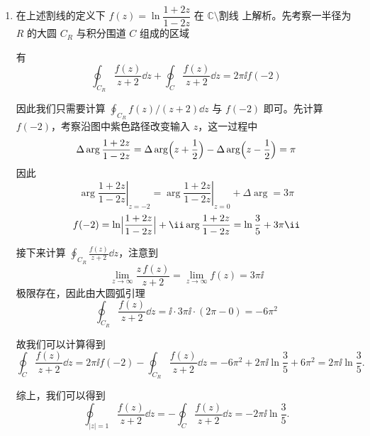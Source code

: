 \begin{question}
\begin{solution}
\begin{enumerate}
综上有
\[ f(z)=\begin{cases}
32\pi\ii\cdot\dfrac{-z-1}{z^2}, & |z|>2,\\[6pt]
32\pi\ii\cdot\dfrac{\ee^{z}-z-1}{z^2}, & |z|<2
\end{cases} \]

  \item 在上述割线的定义下 \(f(z)=\ln\dfrac{1+2z}{1-2z}\) 在 \(\mathbb{C}\setminus\text{割线}\) 上解析。先考察一半径为 \(R\) 的大圆 \(C_R\) 与积分围道 \(C\) 组成的区域

\begin{center}
\end{center}

有
\[ \oint_{C_R} \frac{f(z)}{z+2}\dd{z} + \oint_{C} \frac{f(z)}{z+2}\dd{z} = 2\pi\ii f(-2) \]

因此我们只需要计算 \(\oint_{C_R} f(z)/(z+2)\dd{z}\) 与 \(f(-2)\) 即可。先计算 \(f(-2)\)，考察沿图中紫色路径改变输入 \(z\)，这一过程中
\[ \Delta\arg\frac{1+2z}{1-2z} = \Delta\arg\Bigl(z+\frac12\Bigr) - \Delta\arg\Bigl(z-\frac12\Bigr) = \pi \]
因此
\[ \left.\arg\frac{1+2z}{1-2z}\right|_{z=-2} = \left.\arg\frac{1+2z}{1-2z}\right|_{z=0} + \Delta\arg = 3\pi \]
\[ f(-2)=\ln\Bigl|\frac{1+2z}{1-2z}\Bigr| + \ii\arg\frac{1+2z}{1-2z} = \ln\frac35 + 3\pi\ii \]

接下来计算 \(\displaystyle\oint_{C_R} \frac{f(z)}{z+2}\dd{z}\)，注意到
\[ \lim_{z\to\infty} \frac{z\,f(z)}{z+2} = \lim_{z\to\infty} f(z)=3\pi\ii \]
极限存在，因此由大圆弧引理
\[ \oint_{C_R} \frac{f(z)}{z+2}\dd{z} = \ii\cdot 3\pi\ii\cdot (2\pi-0) = -6\pi^2 \]

故我们可以计算得到
\[ \oint_{C} \frac{f(z)}{z+2}\dd{z} = 2\pi\ii f(-2) - \oint_{C_R} \frac{f(z)}{z+2}\dd{z} = -6\pi^2 + 2\pi\ii\ln\frac35 + 6\pi^2 = 2\pi\ii\ln\frac35. \]

综上，我们可以得到
\[ \oint_{|z|=1} \frac{f(z)}{z+2}\dd{z} = -\oint_{C} \frac{f(z)}{z+2}\dd{z} = -2\pi\ii\ln\frac35. \]
\end{enumerate}
\end{solution}
\end{question}

